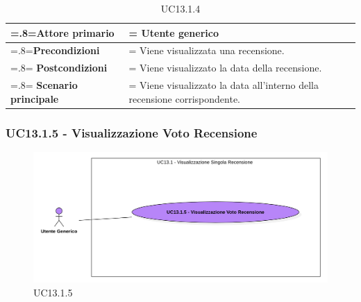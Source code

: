             \begin{table}[H]
                \centering
                \renewcommand{\arraystretch}{1.8}
                \renewcommand\tabularxcolumn[1]{m{#1}}
                \begin{tabularx}{0.9\textwidth} {
                    >{\hsize=.8\hsize\linewidth=\hsize}X
                    >{\hsize=1.2\hsize\linewidth=\hsize}X}
                    \hline
                    \textbf{Attore primario} & Utente generico \\
                    \hline
                    \textbf{Precondizioni} & Viene visualizzata una recensione. \\
                    \hline
                    \textbf{Postcondizioni} & Viene visualizzato la data della recensione. \\
                    \hline
                    \textbf{Scenario principale} & Viene visualizzato la data all'interno della recensione corrispondente. \\
                    \hline
                \end{tabularx}
                \caption{UC13.1.4}
            \end{table}

        \subsubsection{UC13.1.5 - Visualizzazione Voto Recensione}
        \label{UC13.1.5}

            \begin{figure}[H]
                \centering
                \includegraphics[scale=0.6]{src/img/UC13.1.5.png}
                \caption{UC13.1.5}
            \end{figure}


